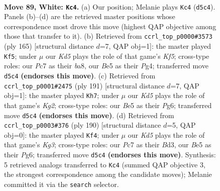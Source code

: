 \documentclass[11pt]{article}
\begin{document}
\clearpage

\begin{figure}[p]\centering
\begin{subfigure}{0.46\textwidth}\centering
\resizebox{\linewidth}{!}{%
\newchessgame
\chessboard[
  setfen={5k2/2P5/8/3KB3/8/8/8/8 w - - 3 89},
  showmover=false,
  pgfstyle=straightmove, color=movearrow, markmove={d5-c4}
]}
\caption{}
\end{subfigure}\hfill
\begin{subfigure}{0.46\textwidth}\centering
\resizebox{\linewidth}{!}{%
\newchessgame
\chessboard[
  setfen={B7/8/8/2K5/5kp1/8/8/8 b - - 1 83},
  showmover=false,
  pgfstyle=straightmove, color=movearrow, markmove={f4-f5}
]}
\caption{}
\end{subfigure}
\\[4pt]
\begin{subfigure}{0.46\textwidth}\centering
\resizebox{\linewidth}{!}{%
\newchessgame
\chessboard[
  setfen={8/1P2K1k1/6p1/8/8/8/8/8 b - - 0 96},
  showmover=false,
  pgfstyle=straightmove, color=movearrow, markmove={g7-h7}
]}
\caption{}
\end{subfigure}\hfill
\begin{subfigure}{0.46\textwidth}\centering
\resizebox{\linewidth}{!}{%
\newchessgame
\chessboard[
  setfen={7k/8/6P1/8/8/3B2K1/8/8 w - - 1 96},
  showmover=false,
  pgfstyle=straightmove, color=movearrow, markmove={g3-f4}
]}
\caption{}
\end{subfigure}
\caption{\textbf{Move 89, White: \texttt{Kc4}.} (a) Our position; Melanie plays \texttt{Kc4} (\texttt{d5c4}). Panels (b)--(d) are the retrieved master positions whose correspondence most drove this move (highest QAP objective among those that transfer to it). (b) Retrieved from \texttt{ccrl\_top\_p0000\#3573} (ply 165) [structural distance $d$=7, QAP obj=1]: the master played \texttt{Kf5}; under $\mu$ our \emph{Kd5} plays the role of that game's \emph{Kf5}; cross-type roles: our \emph{P}c7 as their \emph{b}a8, our \emph{B}e5 as their \emph{P}g4; transferred move \texttt{d5c4} \textbf{(endorses this move)}. (c) Retrieved from \texttt{ccrl\_top\_p0001\#2475} (ply 191) [structural distance $d$=7, QAP obj=1]: the master played \texttt{Kh7}; under $\mu$ our \emph{Kd5} plays the role of that game's \emph{Kg2}; cross-type roles: our \emph{B}e5 as their \emph{P}g6; transferred move \texttt{d5c4} \textbf{(endorses this move)}. (d) Retrieved from \texttt{ccrl\_top\_p0003\#376} (ply 190) [structural distance $d$=5, QAP obj=0]: the master played \texttt{Kf4}; under $\mu$ our \emph{Kd5} plays the role of that game's \emph{Kg3}; cross-type roles: our \emph{P}c7 as their \emph{B}d3, our \emph{B}e5 as their \emph{P}g6; transferred move \texttt{d5c4} \textbf{(endorses this move)}. Synthesis: 5 retrieved analogs transferred to \texttt{Kc4} (summed QAP objective 3, the strongest correspondence among the candidate moves); Melanie committed it via the \texttt{search} selector.}
\label{fig:thought-m176}
\end{figure}
\end{document}
